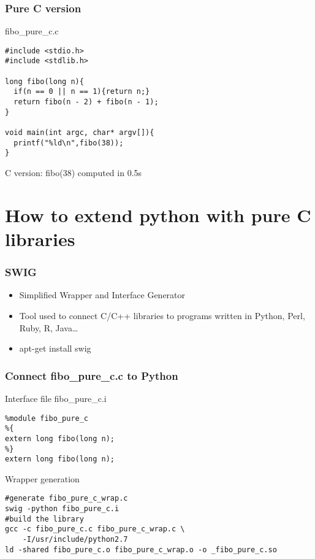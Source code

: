 \documentclass[12pt]{beamer}
\begin{document}
\begin{frame}[fragile]
  \frametitle{Pure C version}
  \begin{block}{fibo\_pure\_c.c}
    \begin{verbatim}
#include <stdio.h>
#include <stdlib.h>

long fibo(long n){
  if(n == 0 || n == 1){return n;}
  return fibo(n - 2) + fibo(n - 1);
}

void main(int argc, char* argv[]){
  printf("%ld\n",fibo(38));
}
    \end{verbatim}
  \end{block}
C version: fibo(38) computed in 0.5s
\end{frame}

\section{How to extend python with pure C libraries}
\begin{frame}
  \begin{block}{}
  \end{block}
\end{frame}

\begin{frame}
  \frametitle{SWIG}
  \begin{block}{}
    \begin{itemize}[<+->]
    \item Simplified Wrapper and Interface Generator
    \item Tool used to connect C/C++ libraries to programs written in Python, Perl, Ruby, R, Java\dots
    \item apt-get install swig
    \end{itemize}
  \end{block}
\end{frame}

\begin{frame}[fragile]
  \frametitle{Connect fibo\_pure\_c.c to Python}
  \begin{block}{Interface file fibo\_pure\_c.i}
    \begin{verbatim}
%module fibo_pure_c
%{
extern long fibo(long n);
%}
extern long fibo(long n);
    \end{verbatim}
  \end{block}
  \begin{block}{Wrapper generation}
    \begin{verbatim}
#generate fibo_pure_c_wrap.c
swig -python fibo_pure_c.i
#build the library
gcc -c fibo_pure_c.c fibo_pure_c_wrap.c \
    -I/usr/include/python2.7
ld -shared fibo_pure_c.o fibo_pure_c_wrap.o -o _fibo_pure_c.so 
    \end{verbatim}
  \end{block}
\end{frame}
\end{document}
